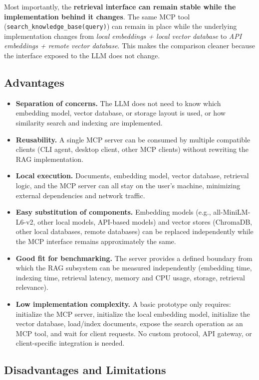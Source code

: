 \documentclass[11pt,a4paper]{article}
\begin{document}
Most importantly, the \textbf{retrieval interface can remain stable while the
implementation behind it changes}. The same MCP tool
(\texttt{search\_knowledge\_base(query)}) can remain in place while the
underlying implementation changes from \emph{local embeddings + local vector
database} to \emph{API embeddings + remote vector database}. This makes the
comparison cleaner because the interface exposed to the LLM does not change.

\subsection{Advantages}

\begin{itemize}[leftmargin=1.6em]
  \item \textbf{Separation of concerns.} The LLM does not need to know which embedding model, vector database, or storage layout is used, or how similarity search and indexing are implemented.
  \item \textbf{Reusability.} A single MCP server can be consumed by multiple compatible clients (CLI agent, desktop client, other MCP clients) without rewriting the RAG implementation.
  \item \textbf{Local execution.} Documents, embedding model, vector database, retrieval logic, and the MCP server can all stay on the user's machine, minimizing external dependencies and network traffic.
  \item \textbf{Easy substitution of components.} Embedding models (e.g., all-MiniLM-L6-v2, other local models, API-based models) and vector stores (ChromaDB, other local databases, remote databases) can be replaced independently while the MCP interface remains approximately the same.
  \item \textbf{Good fit for benchmarking.} The server provides a defined boundary from which the RAG subsystem can be measured independently (embedding time, indexing time, retrieval latency, memory and CPU usage, storage, retrieval relevance).
  \item \textbf{Low implementation complexity.} A basic prototype only requires: initialize the MCP server, initialize the local embedding model, initialize the vector database, load/index documents, expose the search operation as an MCP tool, and wait for client requests. No custom protocol, API gateway, or client-specific integration is needed.
\end{itemize}

\subsection{Disadvantages and Limitations}
\end{document}
